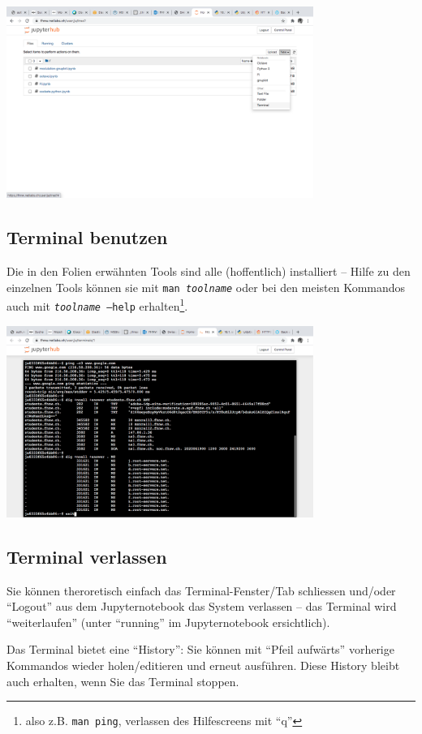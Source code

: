 \documentclass[]{scrartcl}
\begin{document}
\includegraphics[width=10cm]{jupyterhub/jupyterhub_start_terminal}

\subsection*{Terminal benutzen}
Die in den Folien erw\"ahnten Tools sind alle (hoffentlich) installiert -- Hilfe zu den einzelnen Tools k\"onnen sie mit \texttt{man {\em toolname}} oder bei den meisten Kommandos auch mit \texttt{{\em toolname} --help} erhalten\footnote{also z.B. \texttt{man ping}, verlassen des Hilfescreens mit ``q''}.

\includegraphics[width=10cm]{jupyterhub/jupyterhub_terminal}

\subsection*{Terminal verlassen}
Sie k\"onnen theroretisch einfach das Terminal-Fenster/Tab schliessen und/oder ``Logout'' aus dem Jupyternotebook das System verlassen -- das Terminal wird ``weiterlaufen'' (unter ``running'' im Jupyternotebook ersichtlich). 

Das Terminal bietet eine ``History'': Sie k\"onnen mit ``Pfeil aufw\"arts'' vorherige Kommandos wieder holen/editieren und erneut ausf\"uhren. Diese History bleibt auch erhalten, wenn Sie das Terminal stoppen.
\end{document}
